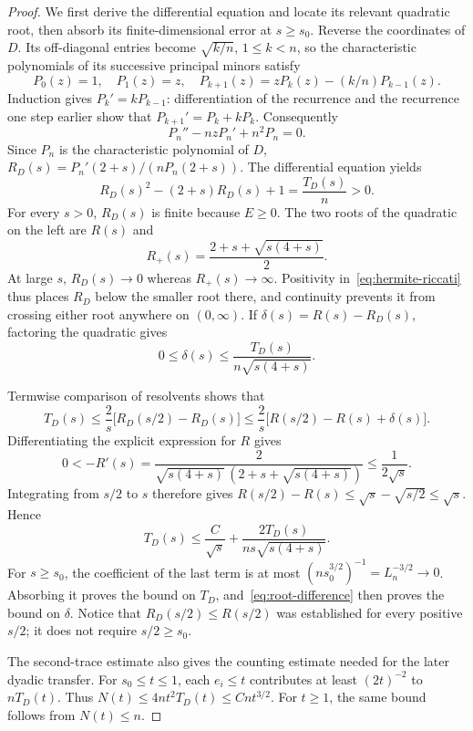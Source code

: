 \begin{proof}
We first derive the differential equation and locate its relevant
quadratic root, then absorb its finite-dimensional error at $s\ge s_0$.
Reverse the coordinates of $D$. Its off-diagonal entries become
$\sqrt{k/n}$, $1\le k<n$, so the characteristic polynomials of its
successive principal minors satisfy
\[
 P_0(z)=1,\quad P_1(z)=z,\quad
 P_{k+1}(z)=zP_k(z)-(k/n)P_{k-1}(z).
\]
Induction gives $P_k'=kP_{k-1}$: differentiation of the recurrence and
the recurrence one step earlier show that
$P_{k+1}'=P_k+kP_k$.  Consequently
\[
 P_n''-nzP_n'+n^2P_n=0.
\]
Since $P_n$ is the characteristic polynomial of $D$,
$R_D(s)=P_n'(2+s)/(nP_n(2+s))$.  The differential equation yields
\begin{equation}
 R_D(s)^2-(2+s)R_D(s)+1=\frac{T_D(s)}n>0.
 \label{eq:hermite-riccati}
\end{equation}
For every $s>0$, $R_D(s)$ is finite because $E\ge0$.
The two roots of the quadratic on the left are $R(s)$ and
\[
 R_+(s)=\frac{2+s+\sqrt{s(4+s)}}2.
\]
At large $s$, $R_D(s)\to0$ whereas $R_+(s)\to\infty$.  Positivity
in~\eqref{eq:hermite-riccati} thus places $R_D$ below the smaller root
there, and continuity prevents it from crossing either root anywhere on
$(0,\infty)$.  If $\delta(s)=R(s)-R_D(s)$, factoring the quadratic gives
\begin{equation}
 0\le\delta(s)\le
 \frac{T_D(s)}{n\sqrt{s(4+s)}}.
 \label{eq:root-difference}
\end{equation}

Termwise comparison of resolvents shows that
\[
 T_D(s)\le\frac2s\bigl[R_D(s/2)-R_D(s)\bigr]
 \le\frac2s\bigl[R(s/2)-R(s)+\delta(s)\bigr].
\]
Differentiating the explicit expression for $R$ gives
\[
 0<-R'(s)=\frac{2}{\sqrt{s(4+s)}\,
          (2+s+\sqrt{s(4+s)})}\le\frac1{2\sqrt s}.
\]
Integrating from $s/2$ to $s$ therefore gives
$R(s/2)-R(s)\le\sqrt s-\sqrt{s/2}\le\sqrt s$.  Hence
\[
 T_D(s)\le\frac C{\sqrt s}
       +\frac{2T_D(s)}{ns\sqrt{s(4+s)}}.
\]
For $s\ge s_0$, the coefficient of the last term is at most
$(ns_0^{3/2})^{-1}=L_n^{-3/2}\to0$.  Absorbing it proves the bound on
$T_D$, and~\eqref{eq:root-difference} then proves the bound on
$\delta$.  Notice that $R_D(s/2)\le R(s/2)$ was established for every
positive $s/2$; it does not require $s/2\ge s_0$.

The second-trace estimate also gives the counting estimate needed for
the later dyadic transfer. For $s_0\le t\le1$, each $e_i\le t$
contributes at least
$(2t)^{-2}$ to $nT_D(t)$.  Thus
$N(t)\le4nt^2T_D(t)\le Cnt^{3/2}$.  For $t\ge1$, the same bound
follows from $N(t)\le n$.
\end{proof}


